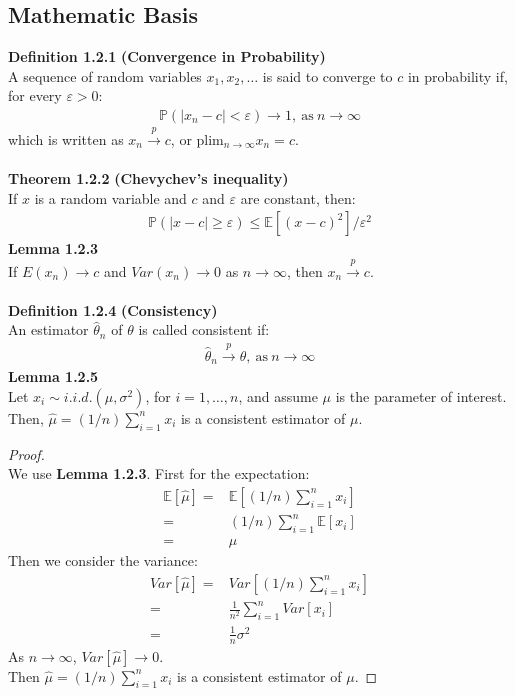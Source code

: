 \documentclass{article}
\begin{document}
\subsection{Mathematic Basis}
\textbf{Definition 1.2.1} \textbf{(Convergence in Probability)}\\
A sequence of random variables $x_1, x_2, \ldots$ is said to converge to $c$ in probability if, for every $\varepsilon > 0$:
	\begin{align*}
		\mathbb{P}(|x_n - c| < \varepsilon) \to 1,\ \text{as}\ n \to \infty 
	\end{align*}
which is written as $x_n \xrightarrow{p} c$, or plim$_{n \to \infty} x_n = c$.\\\\
\textbf{Theorem 1.2.2} \textbf{(Chevychev's inequality)}\\
If $x$ is a random variable and $c$ and $\varepsilon$ are constant, then:
	\begin{align*}
		\mathbb{P}(|x - c| \geq \varepsilon) \leq \mathbb{E}[(x - c)^2] / \varepsilon^2
	\end{align*}
\textbf{Lemma 1.2.3}\\
If $E(x_n) \to c$ and $Var(x_n) \to 0$ as $n \to \infty$, then $x_n \xrightarrow{p} c$.\\\\
\textbf{Definition 1.2.4} \textbf{(Consistency)}\\
An estimator $\hat{\theta}_n$ of $\theta$ is called consistent if:
	\begin{align*}
		\hat{\theta}_n \xrightarrow{p} \theta,\ \text{as}\ n \to \infty
	\end{align*}
\textbf{Lemma 1.2.5}\\
Let $x_i \sim i.i.d. (\mu, \sigma^2)$, for $i = 1, \ldots, n$, and assume $\mu$ is the parameter of interest. Then, $\hat{\mu} = (1/n)\sum^n_{i=1}x_i$ is a consistent estimator of $\mu$.
	\begin{proof}
		\mbox{}\\
		We use \textbf{Lemma 1.2.3}. First for the expectation:
			\begin{align*}
				\mathbb{E}[\hat{\mu}] = &\mathbb{E} \left[ (1/n)\sum^n_{i=1}x_i \right]\\
				= &(1/n) \sum^n_{i=1} \mathbb{E}[ x_i ]\\
				= &\mu
			\end{align*}
		Then we consider the variance:
			\begin{align*}
				Var[\hat{\mu}] = &Var \left[ (1/n) \sum^n_{i=1} x_i \right]\\
				= &\frac{1}{n^2} \sum^n_{i=1} Var[x_i]\\
				= &\frac{1}{n} \sigma^2
			\end{align*}
		As $n \to \infty$, $Var[\hat{\mu}] \to 0.$\\
		Then $\hat{\mu} = (1/n)\sum^n_{i=1}x_i$ is a consistent estimator of $\mu$.
	\end{proof}\noindent
\end{document}

